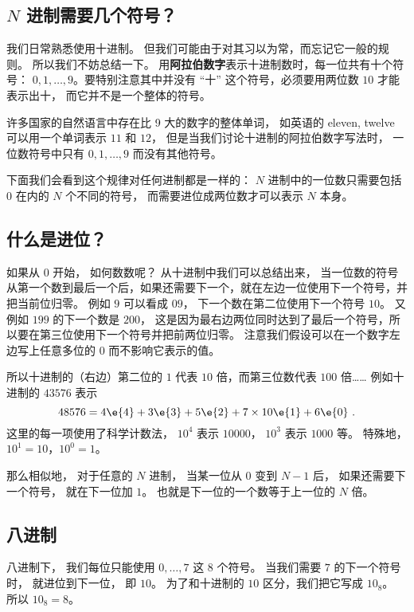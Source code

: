 
\begin{issues}
\issueDraft
\end{issues}

\subsection{$N$ 进制需要几个符号？}
我们日常熟悉使用十进制。 但我们可能由于对其习以为常，而忘记它一般的规则。 所以我们不妨总结一下。 用\textbf{阿拉伯数字}表示十进制数时，每一位共有十个符号： $0,1,\dots, 9$。要特别注意其中并没有 “十” 这个符号，必须要用两位数 $10$ 才能表示出十， 而它并不是一个整体的符号。

许多国家的自然语言中存在比 9 大的数字的整体单词， 如英语的 eleven, twelve 可以用一个单词表示 $11$ 和 $12$， 但是当我们讨论十进制的阿拉伯数字写法时， 一位数符号中只有 $0,1,\dots, 9$ 而没有其他符号。 

下面我们会看到这个规律对任何进制都是一样的： $N$ 进制中的一位数只需要包括 $0$ 在内的 $N$ 个不同的符号， 而需要进位成两位数才可以表示 $N$ 本身。

\subsection{什么是进位？}
如果从 $0$ 开始， 如何数数呢？ 从十进制中我们可以总结出来， 当一位数的符号从第一个数到最后一个后，如果还需要下一个，就在左边一位使用下一个符号，并把当前位归零。 例如 $9$ 可以看成 $09$， 下一个数在第二位使用下一个符号 $10$。 又例如 $199$ 的下一个数是 $200$， 这是因为最右边两位同时达到了最后一个符号，所以要在第三位使用下一个符号并把前两位归零。 注意我们假设可以在一个数字左边写上任意多位的 $0$ 而不影响它表示的值。

所以十进制的（右边）第二位的 $1$ 代表 $10$ 倍，而第三位数代表 $100$ 倍…… 例如十进制的 $43576$ 表示
\begin{equation}\label{eq_Binary_1}
48576 = 4\e{4} + 3\e{3} + 5\e{2} + 7\times 10\e{1} + 6\e{0}~.
\end{equation}
这里的每一项使用了科学计数法，%
$10^4$ 表示 $10000$， $10^3$ 表示 $1000$ 等。 特殊地， $10^1=10$，$10^0=1$。

那么相似地， 对于任意的 $N$ 进制， 当某一位从 $0$ 变到 $N-1$ 后， 如果还需要下一个符号， 就在下一位加 $1$。 也就是下一位的一个数等于上一位的 $N$ 倍。

\subsection{八进制}
八进制下， 我们每位只能使用 $0,\dots,7$ 这 $8$ 个符号。 当我们需要 $7$ 的下一个符号时， 就进位到下一位， 即 $10$。 为了和十进制的 $10$ 区分，我们把它写成 $10_\text{8}$。 所以 $10_\text{8} = 8$。

